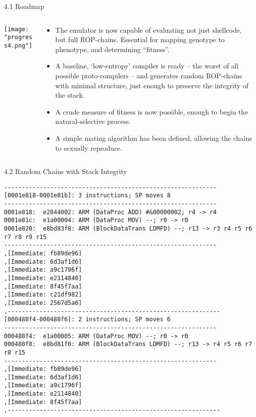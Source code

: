 \documentclass[9pt]{beamer}
\begin{document}
\begin{frame}{4.1 Roadmap}
\begin{columns}
\begin{column}{.4\textwidth}
\begin{center}
\texttt{[image: "progress4.png"]}
\end{center}
\end{column}
\begin{column}{.6\textwidth}
\begin{itemize}
\item The emulator is now capable of evaluating not just shellcode, but full ROP-chains. Essential for mapping genotype to phenotype, and determining ``fitness''.
\item A baseline, `low-entropy' compiler is ready -- the worst of all possible proto-compilers -- and generates random ROP-chains with minimal structure, just enough to preserve the integrity of the stack.
\item A crude measure of fitness is now possible, enough to begin the natural-selective process.
\item A simple mating algorithm has been defined, allowing the chains to sexually reproduce.

\end{itemize}
\end{column}
\end{columns}
\end{frame}

\begin{frame}[fragile]{4.2 Random Chains with Stack Integrity}
\small
\begin{verbatim}
------------------------------------------------------------
[0001e818-0001e81b]: 3 instructions; SP moves 8
------------------------------------------------------------
0001e818:  e2844002: ARM (DataProc ADD) #&00000002; r4 -> r4
0001e81c:  e1a00004: ARM (DataProc MOV) --; r0 -> r0
0001e820:  e8bd83f8: ARM (BlockDataTrans LDMFD) --; r13 -> r3 r4 r5 r6 r7 r8 r9 r15
------------------------------------------------------------
,[Immediate: fb89de96]
,[Immediate: 6d3af1d6]
,[Immediate: a9c1796f]
,[Immediate: e2114840]
,[Immediate: 8f45f7aa]
,[Immediate: c21df982]
,[Immediate: 2567d5a6]
,------------------------------------------------------------
[000488f4-000488f6]: 2 instructions; SP moves 6
------------------------------------------------------------
000488f4:  e1a00005: ARM (DataProc MOV) --; r0 -> r0
000488f8:  e8bd81f0: ARM (BlockDataTrans LDMFD) --; r13 -> r4 r5 r6 r7 r8 r15
------------------------------------------------------------
,[Immediate: fb89de96]
,[Immediate: 6d3af1d6]
,[Immediate: a9c1796f]
,[Immediate: e2114840]
,[Immediate: 8f45f7aa]
,------------------------------------------------------------
\end{verbatim}
    
\end{frame}
\end{document}
